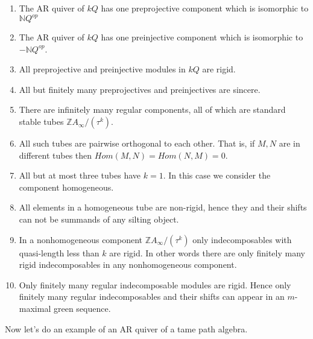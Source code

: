 \begin{theorem}\label{Tame}
\begin{enumerate}
\item The AR quiver of $kQ$ has one preprojective component which is isomorphic to $\mathbb{N}Q^{op}$
\item The AR quiver of $kQ$ has one preinjective component which is isomorphic to $-\mathbb{N}Q^{op}$.
\item All preprojective and preinjective modules in $kQ$ are rigid.
\item All but finitely many preprojectives and preinjectives are sincere.
\item There are infinitely many regular components, all of which are standard stable tubes $\mathbb{Z}A_{\infty}/(\tau^k)$.
\item All such tubes are pairwise orthogonal to each other. That is, if $M,N$ are in different tubes then $Hom (M,N) = Hom (N,M) = 0$.
\item All but at most three tubes have $k=1$. In this case we consider the component homogeneous.
\item All elements in a homogeneous tube are non-rigid, hence they and their shifts can not be summands of any silting object.
\item In a nonhomogeneous component $\mathbb{Z}A_{\infty}/(\tau^k)$ only indecomposables with quasi-length less than $k$ are rigid. In other words there are only finitely many rigid indecomposables in any nonhomogeneous component.
\item Only finitely many regular indecomposable modules are rigid. Hence only finitely many regular indecomposables and their shifts can appear in an $m$-maximal green sequence.
\end{enumerate}
\end{theorem}
\indent Now let's do an example of an AR quiver of a tame path algebra.\\
